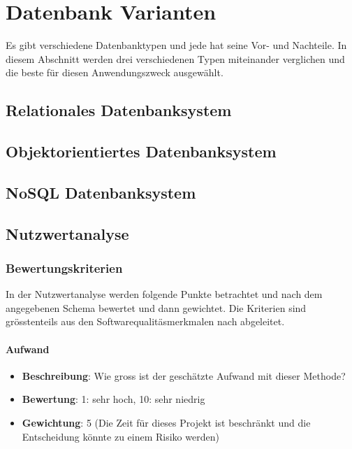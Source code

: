 \section{Datenbank Varianten}\label{db_varianten}
Es gibt verschiedene Datenbanktypen und jede hat seine Vor- und Nachteile. In diesem Abschnitt werden drei verschiedenen Typen miteinander verglichen und die beste für diesen Anwendungszweck ausgewählt.

\subsection{Relationales Datenbanksystem}\label{rdbms}


\subsection{Objektorientiertes Datenbanksystem}\label{object_db}

\subsection{NoSQL Datenbanksystem}\label{no_sql_db}


\newpage
\subsection{Nutzwertanalyse}\label{architektur_nutzwertanalyse}

\subsubsection{Bewertungskriterien}\label{architektur_bewertungspunkte}

In der Nutzwertanalyse werden folgende Punkte betrachtet und nach dem angegebenen Schema bewertet und dann gewichtet. Die Kriterien sind grösstenteils aus den Softwarequalitäsmerkmalen nach \cite{iso_9126} abgeleitet.

\paragraph{Aufwand}
\begin{itemize}
	\item \textbf{Beschreibung}: Wie gross ist der geschätzte Aufwand mit dieser Methode?
	\item \textbf{Bewertung}: 1: sehr hoch, 10: sehr niedrig
	\item \textbf{Gewichtung}: 5 (Die Zeit für dieses Projekt ist beschränkt und die Entscheidung könnte zu einem Risiko werden)
\end{itemize}

